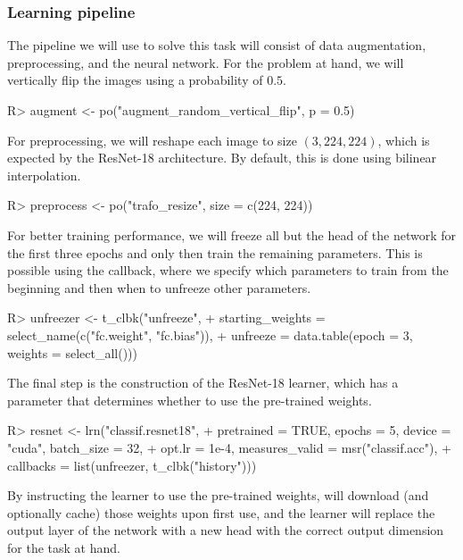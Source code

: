 \documentclass[article]{jss}
\theoremstyle{definition}
\begin{document}
\subsubsection{Learning pipeline}

The pipeline we will use to solve this task will consist of data augmentation, preprocessing, and the neural network.
For the problem at hand, we will vertically flip the images using a probability of $0.5$.

\begin{CodeInput}
R> augment <- po("augment_random_vertical_flip", p = 0.5)
\end{CodeInput}

For preprocessing, we will reshape each image to size $(3, 224, 224)$, which is expected by the ResNet-18 architecture.
By default, this is done using bilinear interpolation.

\begin{CodeInput}
R> preprocess <- po("trafo_resize", size = c(224, 224))
\end{CodeInput}

For better training performance, we will freeze all but the head of the network for the first three epochs and only then train the remaining parameters.
This is possible using the  callback, where we specify which parameters to train from the beginning and then when to unfreeze other parameters.

\begin{CodeInput}
R> unfreezer <- t_clbk("unfreeze",
+    starting_weights = select_name(c("fc.weight", "fc.bias")),
+    unfreeze = data.table(epoch = 3, weights = select_all()))
\end{CodeInput}

The final step is the construction of the ResNet-18 learner, which has a parameter  that determines whether to use the pre-trained weights.

\begin{CodeInput}
R> resnet <- lrn("classif.resnet18",
+    pretrained = TRUE, epochs = 5, device = "cuda", batch_size = 32,
+    opt.lr = 1e-4, measures_valid = msr("classif.acc"),
+    callbacks = list(unfreezer, t_clbk("history")))
\end{CodeInput}

By instructing the learner to use the pre-trained weights,  will download (and optionally cache) those weights upon first use, and the \torch{} learner will replace the output layer of the network with a new head with the correct output dimension for the task at hand.
\end{document}
